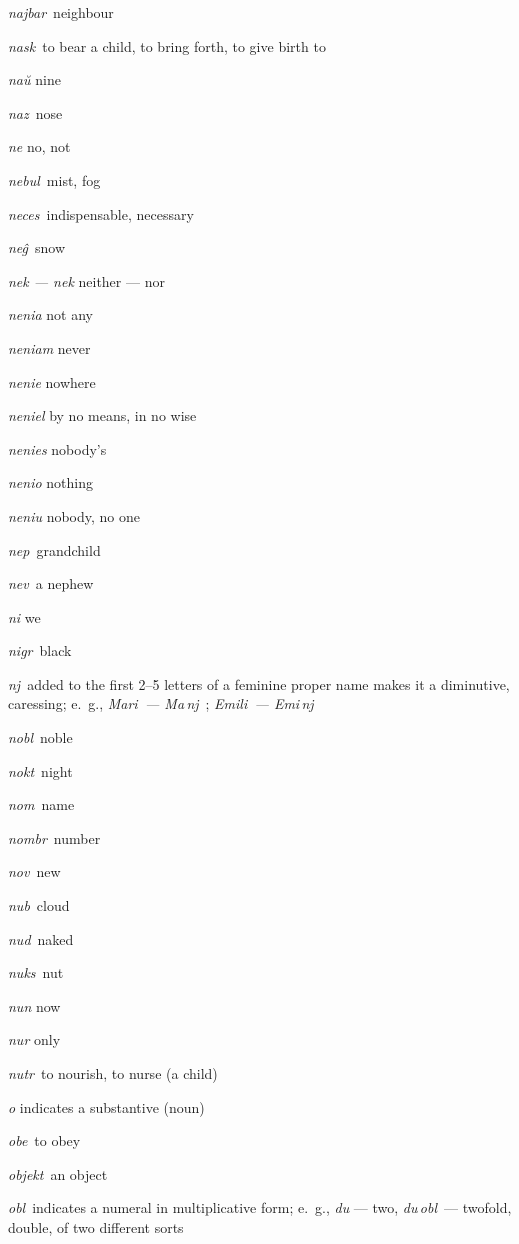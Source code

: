 \begin{landscape}
\begin{multicols}{5}
\begin{outdent}{1em}
\emph{najbar\,} neighbour

\emph{nask\,} to bear a child, to bring forth, to give birth to

\emph{naŭ} nine

\emph{naz\,} nose

\emph{ne} no, not

\emph{nebul\,} mist, fog

\emph{neces\,} indispensable, necessary

\emph{neĝ\,} snow

\emph{nek — nek} neither — nor

\emph{nenia} not any

\emph{neniam} never

\emph{nenie} nowhere

\emph{neniel} by no means, in no wise

\emph{nenies} nobody’s

\emph{nenio} nothing

\emph{neniu} nobody, no one

\emph{nep\,} grandchild

\emph{nev\,} a nephew

\emph{ni} we

\emph{nigr\,} black

\emph{nj\,} added to the first 2--5 letters of a feminine proper name makes it a diminutive, caressing; e.~g., \emph{Mari\, — Ma\,nj\,} ; \emph{Emili\, — Emi\,nj\,} 

\emph{nobl\,} noble

\emph{nokt\,} night

\emph{nom\,} name

\emph{nombr\,} number

\emph{nov\,} new

\emph{nub\,} cloud

\emph{nud\,} naked

\emph{nuks\,} nut

\emph{nun} now

\emph{nur} only

\emph{nutr\,} to nourish, to nurse (a child)
\end{outdent}


\begin{outdent}{1em}
\emph{o} indicates a substantive (noun)

\emph{obe\,} to obey

\emph{objekt\,} an object

\emph{obl\,} indicates a numeral in multiplicative form; e.~g., \emph{du} — two, \emph{du\,obl\,} — twofold, double, of two different sorts


\end{outdent}
\end{multicols}
\end{landscape}
